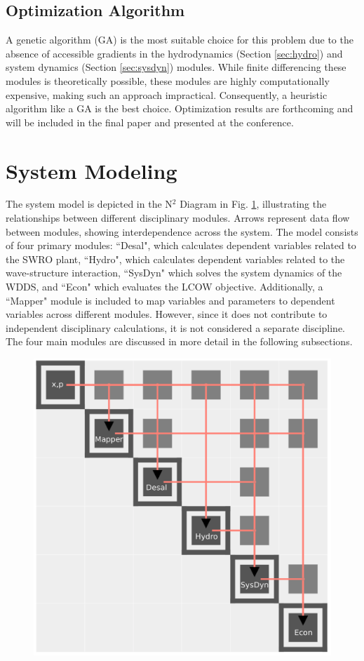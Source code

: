 \documentclass[twocolumn,10pt]{asme2e}
\begin{document}
\subsection{Optimization Algorithm}
A genetic algorithm (GA) is the most suitable choice for this problem due to the absence of accessible gradients in the hydrodynamics (Section \ref{sec:hydro}) and system dynamics (Section \ref{sec:sysdyn}) modules. While finite differencing these modules is theoretically possible, these modules are highly computationally expensive, making such an approach impractical. Consequently, a heuristic algorithm like a GA is the best choice. Optimization results are forthcoming and will be included in the final paper and presented at the conference. 

\section{System Modeling} \label{sec:sysmodel}
The system model is depicted in the N$^2$ Diagram in Fig. \ref{fig:n2}, illustrating the relationships between different disciplinary modules. Arrows represent data flow between modules, showing interdependence across the system. The model consists of four primary modules: ``Desal", which calculates dependent variables related to the SWRO plant, ``Hydro", which calculates dependent variables related to the wave-structure interaction, ``SysDyn" which solves the system dynamics of the WDDS, and ``Econ" which evaluates the LCOW objective. Additionally, a ``Mapper" module is included to map variables and parameters to dependent variables across different modules. However, since it does not contribute to independent disciplinary calculations, it is not considered a separate discipline. The four main modules are discussed in more detail in the following subsections. 

\begin{figure}
    \centering
    \includegraphics[width=0.7\linewidth]{../figs/n2.pdf}
    \label{fig:n2}
\end{figure} 
\end{document}
